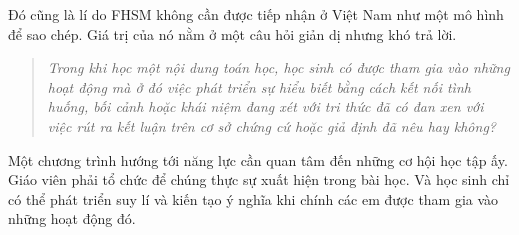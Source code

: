 Đó cũng là lí do FHSM không cần được tiếp nhận ở Việt Nam như một mô hình để sao chép. Giá trị của nó nằm ở một câu hỏi giản dị nhưng khó trả lời.

\begin{quote}
\emph{Trong khi học một nội dung toán học, học sinh có được tham gia vào những hoạt động mà ở đó việc phát triển sự hiểu biết bằng cách kết nối tình huống, bối cảnh hoặc khái niệm đang xét với tri thức đã có đan xen với việc rút ra kết luận trên cơ sở chứng cứ hoặc giả định đã nêu hay không?}
\end{quote}

Một chương trình hướng tới năng lực cần quan tâm đến những cơ hội học tập ấy. Giáo viên phải tổ chức để chúng thực sự xuất hiện trong bài học. Và học sinh chỉ có thể phát triển suy lí và kiến tạo ý nghĩa khi chính các em được tham gia vào những hoạt động đó.

\endgroup
